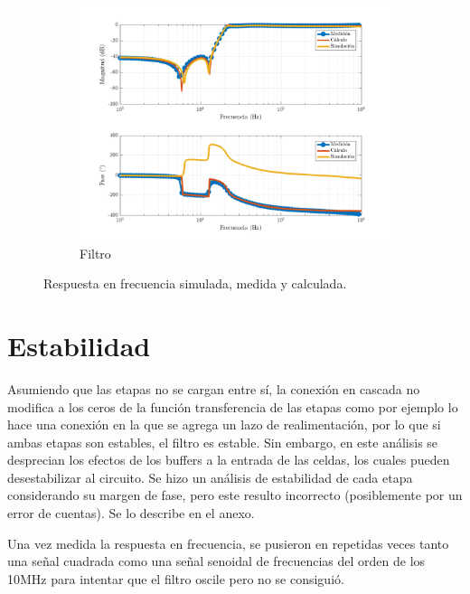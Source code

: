 \documentclass[../../tc_tp5_main.tex]{subfiles}
\begin{document}
\begin{figure}[H]
\ContinuedFloat	
	\centering
	\begin{subfigure}[t]{0.8\textwidth}
		\centering
		\includegraphics[width=\textwidth]{imagenes/total_bode.png}
		\caption{Filtro}
		\label{fig:ej3_bode_etapa_3}
	\end{subfigure}	
	\caption{Respuesta en frecuencia simulada, medida y calculada.}
\end{figure}








\section{Estabilidad}
Asumiendo que las etapas no se cargan entre s\'i, la  conexi\'on en cascada no modifica a los ceros de la funci\'on transferencia de las etapas como por ejemplo lo hace una conexi\'on en la que se agrega un lazo de realimentaci\'on, por lo que si ambas etapas son estables, el filtro es estable. Sin embargo, en este an\'alisis se desprecian los efectos de los buffers a la entrada de las celdas, los cuales pueden desestabilizar al circuito. 
Se hizo un an\'alisis de estabilidad de cada etapa considerando su margen de fase, pero este resulto incorrecto (posiblemente por un error de cuentas). Se lo describe en el anexo.

Una vez medida la respuesta en frecuencia, se pusieron en repetidas veces tanto una se\~nal cuadrada como una se\~nal senoidal de  frecuencias del orden de los 10MHz para intentar que el filtro oscile pero no se consigui\'o. 
\end{document}
